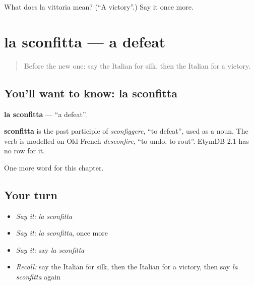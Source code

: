 \begin{tcolorbox}[breakable,colback=teal!4,colframe=teal!35!black,title={Before you move on}]
What does la vittoria mean? (\textquotedblleft{}A victory\textquotedblright{}.) Say it once more.
\end{tcolorbox}
\section[la sconfitta]{la sconfitta — a defeat}

\label{lesson:IT-C231-sconfitta}



\begin{quote}
Before the new one: say the Italian for silk, then the Italian for a victory.
\end{quote}

\subsection*{You'll want to know: la sconfitta}
\textbf{la sconfitta} — \textquotedblleft{}a defeat\textquotedblright{}.

\begin{cousinweb}
\textbf{sconfitta} is the past participle of \emph{sconfiggere}, \textquotedblleft{}to defeat\textquotedblright{}, used as a noun. The verb is modelled on Old French \emph{desconfire}, \textquotedblleft{}to undo, to rout\textquotedblright{}. EtymDB 2.1 has no row for it.
\end{cousinweb}

\begin{grammarlens}[title={What you've built}]
One more word for this chapter.
\end{grammarlens}

\subsection*{Your turn}
\begin{itemize}
\raggedright
  \item \emph{Say it:} \emph{la sconfitta}
  \item \emph{Say it:} \emph{la sconfitta}, once more
  \item \emph{Say it:} say \emph{la sconfitta}
  \item \emph{Recall:} say the Italian for silk, then the Italian for a victory, then say \emph{la sconfitta} again
\end{itemize}

